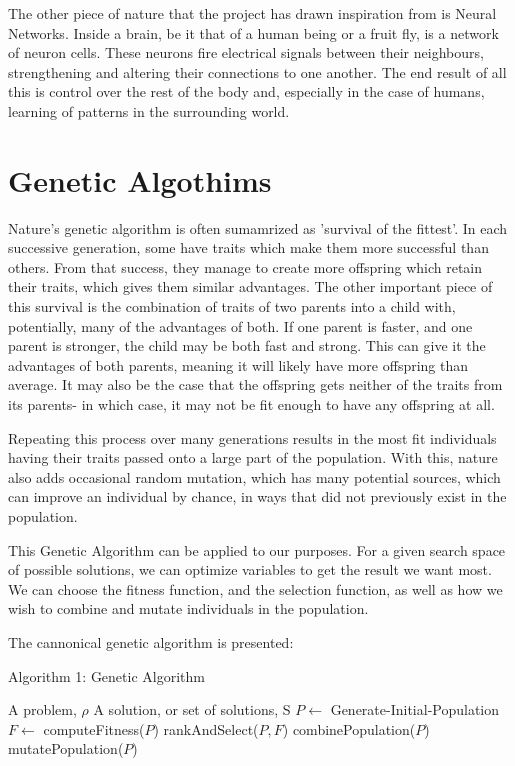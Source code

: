 \documentclass[a4paper,11pt]{report}
\begin{document}
The other piece of nature that the project has drawn inspiration from is Neural Networks. Inside a brain, 
be it that of a human being or a fruit fly, is a network of neuron cells. These neurons fire electrical 
signals between their neighbours, strengthening and altering their connections to one another. The end 
result of all this is control over the rest of the body and, especially in the case of humans, learning
of patterns in the surrounding world. 

\section{Genetic Algothims}

Nature's genetic algorithm is often sumamrized as 'survival of the fittest'. In each successive 
generation, some have traits which make them more successful than others. From that success,
they manage to create more offspring which retain their traits, which gives them similar advantages. 
The other important piece of this survival is the combination of traits of two parents into a child
with, potentially, many of the advantages of both. If one parent is faster, and one parent is stronger, 
the child may be both fast and strong. This can give it the advantages of both 
parents, meaning it will likely have more offspring than average. 
It may also be the case that the offspring gets neither of the 
traits from its parents- in which case, it may not be fit enough to have any offspring at all.

Repeating this process over many generations results in the most fit individuals having their traits 
passed onto a large part of the population. With this, nature also adds occasional random mutation, 
which has many potential sources, which can improve an individual by chance, in ways that did not 
previously exist in the population.

This Genetic Algorithm can be applied to our purposes. For a given search space of possible solutions, 
we can optimize variables to get the result we want most. We can choose the fitness function, and the selection 
function, as well as how we wish to combine and mutate individuals in the population. 

The cannonical genetic algorithm is presented:

\begin{algorithm}
\caption{Algorithm 1: Genetic Algorithm}
\renewcommand{\algorithmicrequire}{\textbf{Input:}}
\renewcommand{\algorithmicensure}{\textbf{Output:}}
\begin{algorithmic}[1]
\REQUIRE A problem, $\rho$
\ENSURE A solution, or set of solutions, S
\STATE $P \leftarrow$ Generate-Initial-Population
  \STATE $F \leftarrow $ computeFitness($P$)
  \STATE rankAndSelect($P, F$)
  \STATE combinePopulation($P$)
  \STATE mutatePopulation($P$)
\ENDWHILE

\end{algorithmic}
\end{algorithm}  
\end{document}
